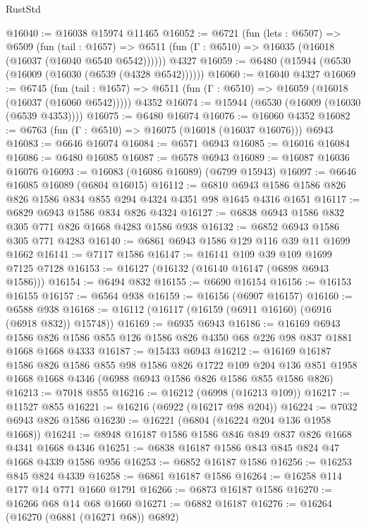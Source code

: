 \begin{lexlean}{RustStd}
\begin{coremodule}
@16040 := @16038 @15974 @11465
@16052 := @6721
    (fun (lets : @6507) =>
    @6509
      (fun (tail : @1657) =>
      @6511 (fun (Γ : @6510) => @16035 (@16018 (@16037 (@16040 @6540 @6542))))))
    @4327
@16059 := @6480 (@15944 (@6530 (@16009 (@16030 (@6539 (@4328 @6542))))))
@16060 := @16040 @4327
@16069 := @6745
    (fun (tail : @1657) => @6511 (fun (Γ : @6510) => @16059 (@16018 (@16037 (@16060 @6542)))))
    @4352
@16074 := @15944 (@6530 (@16009 (@16030 (@6539 @4353))))
@16075 := @6480 @16074
@16076 := @16060 @4352
@16082 := @6763 (fun (Γ : @6510) => @16075 (@16018 (@16037 @16076))) @6943
@16083 := @6646 @16074
@16084 := @6571 @6943
@16085 := @16016 @16084
@16086 := @6480 @16085
@16087 := @6578 @6943
@16089 := @16087 @16036 @16076
@16093 := @16083 (@16086 @16089) (@6799 @15943)
@16097 := @6646 @16085 @16089 (@6804 @16015)
@16112 := @6810 @6943 @1586 @1586 @826 @826 @1586 @834 @855 @294 @4324 @4351 @98 @1645 @4316 @1651
@16117 := @6829 @6943 @1586 @834 @826 @4324
@16127 := @6838 @6943 @1586 @832 @305 @771 @826 @1668 @4283 @1586 @938
@16132 := @6852 @6943 @1586 @305 @771 @4283
@16140 := @6861 @6943 @1586 @129 @116 @39 @11 @1699 @1662
@16141 := @7117 @1586
@16147 := @16141 @109 @39 @109 @1699 @7125 @7128
@16153 := @16127 (@16132 (@16140 @16147 (@6898 @6943 @1586)))
@16154 := @6494 @832
@16155 := @6690 @16154
@16156 := @16153 @16155
@16157 := @6564 @938
@16159 := @16156 (@6907 @16157)
@16160 := @6588 @938
@16168 := @16112 (@16117 (@16159 (@6911 @16160) (@6916 (@6918 @832)) @15748))
@16169 := @6935 @6943
@16186 := @16169
    @6943
    @1586
    @826
    @1586
    @855
    @126
    @1586
    @826
    @4350
    @68
    @226
    @98
    @837
    @1881
    @1668
    @1668
    @4333
@16187 := @15433 @6943
@16212 := @16169
    @16187
    @1586
    @826
    @1586
    @855
    @98
    @1586
    @826
    @1722
    @109
    @204
    @136
    @851
    @1958
    @1668
    @1668
    @4346
    (@6988 @6943 @1586 @826 @1586 @855 @1586 @826)
@16213 := @7018 @855
@16216 := @16212 (@6998 (@16213 @109))
@16217 := @11527 @855
@16221 := @16216 (@6922 (@16217 @98 @204))
@16224 := @7032 @6943 @826 @1586
@16230 := @16221 (@6804 (@16224 @204 @136 @1958 @1668))
@16241 := @8948 @16187 @1586 @1586 @846 @849 @837 @826 @1668 @4341 @1668 @4346
@16251 := @6838 @16187 @1586 @843 @845 @824 @47 @1668 @4339 @1586 @956
@16253 := @6852 @16187 @1586
@16256 := @16253 @845 @824 @4339
@16258 := @6861 @16187 @1586
@16264 := @16258 @114 @177 @14 @771 @1660 @1791
@16266 := @6873 @16187 @1586
@16270 := @16266 @68 @14 @68 @1660
@16271 := @6882 @16187
@16276 := @16264 (@16270 (@6881 (@16271 @68)) @6892)

\end{coremodule}
\end{lexlean}
